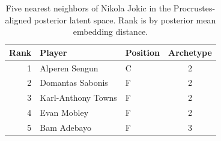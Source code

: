\begin{table}[htbp]
  \centering\small
  \begin{tabular}{rllc}
    \toprule
    Rank & Player & Position & Archetype \\
    \midrule
    1 & Alperen Sengun & C & 2 \\
    2 & Domantas Sabonis & F & 2 \\
    3 & Karl-Anthony Towns & F & 2 \\
    4 & Evan Mobley & F & 2 \\
    5 & Bam Adebayo & F & 3 \\
    \bottomrule
  \end{tabular}
  \caption{Five nearest neighbors of Nikola Jokic in the Procrustes-aligned posterior latent space. Rank is by posterior mean embedding distance.}
  \label{tab:Nikola_Jokic_neighbors}
\end{table}


